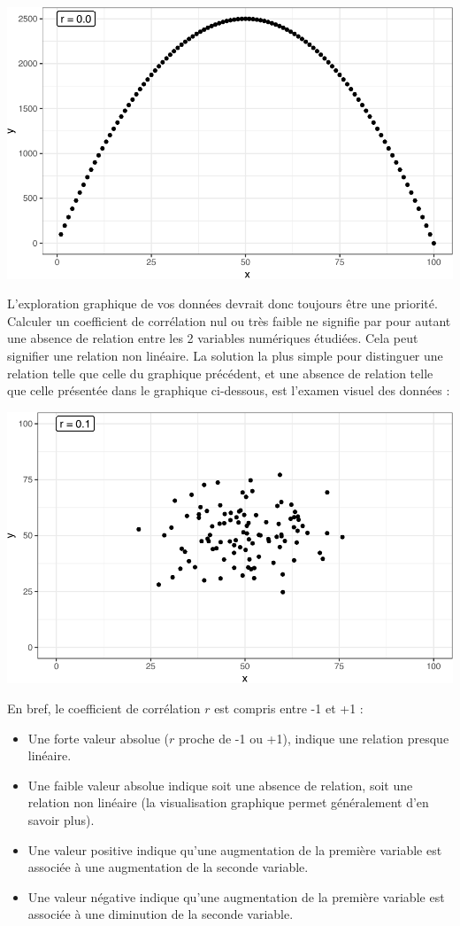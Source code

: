 \documentclass[
  a4paper,
]{article}
\providecommand{\tightlist}{%
  \setlength{\itemsep}{0pt}\setlength{\parskip}{0pt}}
\begin{document}
\begin{center}\includegraphics[width=0.9\linewidth]{figure/unnamed-chunk-98-1} \end{center}

L'exploration graphique de vos données devrait donc toujours être une priorité. Calculer un coefficient de corrélation nul ou très faible ne signifie par pour autant une absence de relation entre les 2 variables numériques étudiées. Cela peut signifier une relation non linéaire. La solution la plus simple pour distinguer une relation telle que celle du graphique précédent, et une absence de relation telle que celle présentée dans le graphique ci-dessous, est l'examen visuel des données :

\begin{center}\includegraphics[width=0.9\linewidth]{figure/unnamed-chunk-99-1} \end{center}

En bref, le coefficient de corrélation \(r\) est compris entre -1 et +1 :

\begin{itemize}
\tightlist
\item
  Une forte valeur absolue (\(r\) proche de -1 ou +1), indique une relation presque linéaire.
\item
  Une faible valeur absolue indique soit une absence de relation, soit une relation non linéaire (la visualisation graphique permet généralement d'en savoir plus).
\item
  Une valeur positive indique qu'une augmentation de la première variable est associée à une augmentation de la seconde variable.
\item
  Une valeur négative indique qu'une augmentation de la première variable est associée à une diminution de la seconde variable.
\end{itemize}
\end{document}

